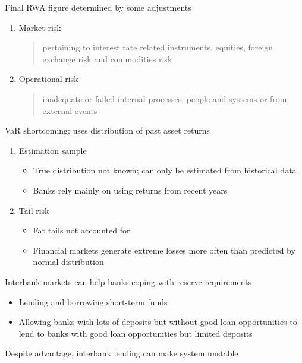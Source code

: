\documentclass{beamer}
\begin{document}
\begin{frame}
  Final RWA figure determined by some adjustments
  \begin{enumerate}
    \item Market risk
    \begin{quote}
      pertaining to interest rate related instruments, equities, foreign exchange risk and commodities risk
    \end{quote}
    \item Operational risk
    \begin{quote}
      inadequate or failed internal processes, people and systems or from external events
    \end{quote}
  \end{enumerate}
\end{frame}

\begin{frame}
 VaR shortcoming: uses distribution of past asset returns 
\begin{enumerate}
  \item Estimation sample
  \begin{itemize}
    \item True distribution not known; can only be estimated from historical data
    \item Banks rely mainly on using returns from recent years
  \end{itemize}
  \medskip
  \item Tail risk
  \begin{itemize}
    \item Fat tails not accounted for
    \item Financial markets generate extreme losses more often than predicted by normal distribution    
  \end{itemize}
\end{enumerate}
\end{frame}

\begin{frame}
  Interbank markets can help banks coping with reserve requirements
\begin{itemize}
  \item Lending and borrowing short-term funds
  \item Allowing banks with lots of deposits but without good loan opportunities to lend to banks with good loan opportunities but limited deposits
\end{itemize}
\medskip
Despite advantage, interbank lending can make system unstable
\end{frame}
\end{document}
